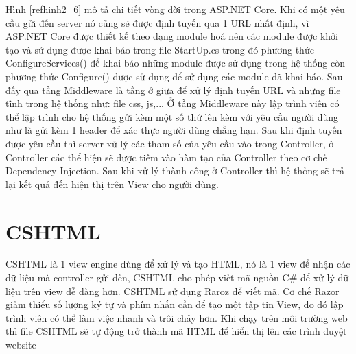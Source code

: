 \par
Hình \ref{refhinh2_6} mô tả chi tiết vòng đời trong ASP.NET Core. Khi có một yêu cầu gửi đến server nó cũng sẽ được định tuyến qua 1 URL nhất định, vì ASP.NET Core được thiết kế theo dạng module hoá nên các module được khởi tạo và sử dụng được khai báo trong file StartUp.cs trong đó phương thức ConfigureServices() để khai báo những module được sử dụng trong hệ thống còn phương thức Configure() được sử dụng để sử dụng các module đã khai báo. Sau đấy qua tầng Middleware là tầng ở giữa để xử lý định tuyến URL và những file tĩnh trong hệ thống như: file css, js,... Ở tầng Middleware này lập trình viên có thể lập trình cho hệ thống gửi kèm một số thứ lên kèm với yêu cầu người dùng như là gửi kèm 1 header để xác thực người dùng chằng hạn. Sau khi định tuyến được yêu cầu thì server xử lý các tham số của yêu cầu vào trong Controller, ở Controller các thể hiện sẽ được tiêm vào hàm tạo của Controller theo cơ chế Dependency Injection. Sau khi xử lý thành công ở Controller thì hệ thống sẽ trả lại kết quả đến hiện thị trên View cho người dùng. 
\section{CSHTML}
CSHTML là 1 view engine dùng để xử lý và tạo HTML, nó là 1 view để nhận các dữ liệu mà controller gửi đến, CSHTML cho phép viết mã nguồn C\# để xử lý dữ liệu trên view dễ dàng hơn. CSHTML sử dụng Raroz để viết mã. Cơ chế Razor giảm thiểu số lượng ký tự và phím nhấn cần để tạo một tập tin View, do đó lập trình viên có thể làm việc nhanh và trôi chảy hơn. Khi chạy trên môi trường web thì file CSHTML sẽ tự động trở thành mã HTML để hiển thị lên các trình duyệt website
